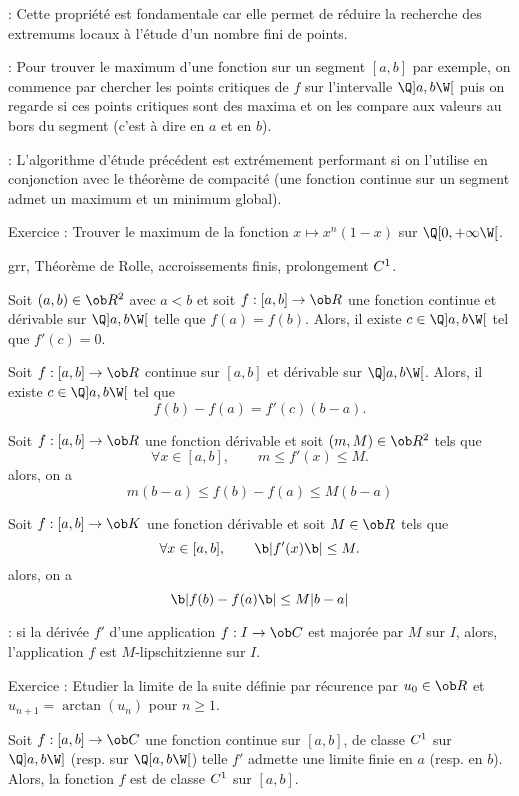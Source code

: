 \Remarque : Cette propriété est fondamentale car elle permet de réduire la recherche des extremums locaux à l'étude d'un nombre fini de points. 
\bigskip

\Remarque : Pour trouver le maximum d'une fonction sur un segment $[a,b]$ par exemple, on commence par chercher les points critiques de $f$ sur l'intervalle $\Q]a,b\W[$ puis on regarde si ces points critiques sont des maxima et on les compare aux valeurs au bors du segment (c'est à dire en $a$ et en $b$).
\bigskip

\Remarque  : L'algorithme d'étude précédent est extrémement performant si on l'utilise en conjonction 
avec le théorème de compacité (une fonction continue sur un segment admet un maximum et un minimum global). 
\bigskip

Exercice :  Trouver le maximum de la fonction $x\mapsto x^n(1-x)$ sur $\Q[0,+\infty\W[$. 
\bigskip

\Subsection grr, Théorème de Rolle, accroissements finis, prolongement $\sc C^1$. 

\Theoreme [Title=Théorème de Rolle] Soit $(a,b)\in\ob R^2$ avec $a<b$ et soit $f:[a,b]\to\ob R$ une fonction continue et dérivable sur $\Q]a,b\W[$ telle que $f(a)=f(b)$. Alors, il existe $c\in\Q]a,b\W[$ tel que $f'(c)=0$. 
\bigskip

\Theoreme [Title=Egalité des accroissements finis] 
Soit $f:[a,b]\to\ob R$ continue sur $[a,b]$ et dérivable sur $\Q]a,b\W[$. 
Alors, il existe $c\in\Q]a,b\W[$ tel que $$
f(b)-f(a)=f'(c)(b-a).
$$ 

\Theoreme [Title=Inégalités des accroissements finis] Soit $f:[a,b]\to\ob R$ une fonction dérivable et soit $(m,M)\in\ob R^2$ tels que 
$$
\forall x\in[a,b], \qquad m\le f'(x)\le M.
$$
alors, on a 
$$
m(b-a)\le f(b)-f(a)\le M(b-a)
$$
\bigskip

\Theoreme [Title=Inégalités des accroissements finis II]
Soit $f:[a,b]\to\ob K$ une fonction dérivable et soit $M\in\ob R$ tels que 
$$
\forall x\in[a,b], \qquad \b|f'(x)\b|\le M.
$$
alors, on a 
$$
\b|f(b)-f(a)\b|\le M|b-a|
$$

\Remarque : si la dérivée $f'$ d'une application $f:I\to\ob C$ est majorée par $M$ sur $I$, alors, l'application $f$ est $M$-lipschitzienne sur $I$. 
\bigskip 

Exercice :  Etudier la limite de la suite définie par récurence par $u_0\in\ob R$ et $u_{n+1}=\arctan(u_n)$ 
pour $n\ge1$. 
\bigskip

\Theoreme [Title=Théorème de prolongement $\sc C^1$]
Soit $f:[a,b]\to\ob C$ une fonction continue sur $[a,b]$, de classe $\sc C^1$ sur $\Q]a,b\W]$ (resp. sur $\Q[a,b\W[$) telle $f'$ admette une limite finie en $a$ (resp. en $b$). Alors, la fonction $f$ est de classe $\sc C^1$ sur $[a,b]$. 
\bigskip

